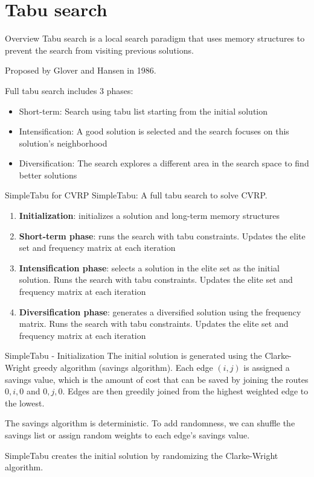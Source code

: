 \documentclass[9pt]{beamer}
\begin{document}
\section{Tabu search}
\begin{frame}{Overview}
Tabu search \cite{glover1986future} is a local search paradigm that uses memory structures to prevent the search from visiting previous solutions.

Proposed by Glover and Hansen in 1986.

Full tabu search includes 3 phases:
\begin{itemize}
    \item Short-term: Search using tabu list starting from the initial solution
    \item Intensification: A good solution is selected and the search focuses on this solution's neighborhood
    \item Diversification: The search explores a different area in the search space to find better solutions
\end{itemize}
\end{frame}

\begin{frame}{SimpleTabu for CVRP}
    SimpleTabu: A full tabu search to solve CVRP.

    \begin{enumerate}
        \item \textbf{Initialization}: initializes a solution and long-term memory structures
        \item \textbf{Short-term phase}: runs the search with tabu constraints. Updates the elite set and frequency matrix at each iteration
        \item \textbf{Intensification phase}: selects a solution in the elite set as the initial solution. Runs the search with tabu constraints. Updates the elite set and frequency matrix at each iteration
        \item \textbf{Diversification phase}: generates a diversified solution using the frequency matrix. Runs the search with tabu constraints. Updates the elite set and frequency matrix at each iteration
    \end{enumerate}
\end{frame}

\begin{frame}{SimpleTabu - Initialization}
    The initial solution is generated using the Clarke-Wright greedy algorithm (savings algorithm). Each edge $(i, j)$ is assigned a savings value, which is the amount of cost that can be saved by joining the routes $0, i, 0$ and $0, j, 0$. Edges are then greedily joined from the highest weighted edge to the lowest.

    The savings algorithm is deterministic. To add randomness, we can shuffle the savings list or assign random weights to each edge's savings value.

    SimpleTabu creates the initial solution by randomizing the Clarke-Wright algorithm.
\end{frame}
\end{document}
